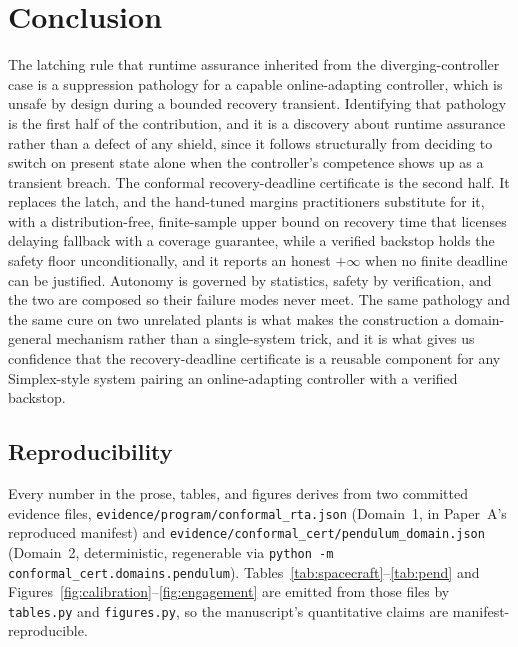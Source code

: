\documentclass[journal]{IEEEtran}
\theoremstyle{plain}
\theoremstyle{definition}
\begin{document}
\section{Conclusion}
\label{sec:conclusion}
The latching rule that runtime assurance inherited from the diverging-controller case is a
suppression pathology for a capable online-adapting controller, which is unsafe by design
during a bounded recovery transient. Identifying that pathology is the first half of the
contribution, and it is a discovery about runtime assurance rather than a defect of any
shield, since it follows structurally from deciding to switch on present state alone when the
controller's competence shows up as a transient breach. The conformal recovery-deadline
certificate is the second half. It replaces
the latch, and the hand-tuned margins practitioners substitute for it, with a
distribution-free, finite-sample upper bound on recovery time that licenses
delaying fallback with a coverage guarantee, while a verified backstop holds the safety floor
unconditionally, and it reports an honest $+\infty$ when no finite deadline can be justified.
Autonomy is governed by statistics, safety by verification, and the two are composed so their
failure modes never meet. The same
pathology and the same cure on two unrelated plants is what makes the construction a
domain-general mechanism rather than a single-system trick, and it is what gives us
confidence that the recovery-deadline certificate is a reusable component for any
Simplex-style system pairing an online-adapting controller with a verified backstop.

\subsection{Reproducibility} Every number in the prose, tables, and figures derives from two
committed evidence files, \texttt{evidence/\allowbreak{}program/\allowbreak{}conformal\_rta.json} (Domain~1, in
Paper~A's reproduced manifest) and \texttt{evidence/\allowbreak{}conformal\_cert/\allowbreak{}pendulum\_domain.json}
(Domain~2, deterministic, regenerable via \texttt{python -m conformal\_cert.domains.pendulum}).
Tables~\ref{tab:spacecraft}--\ref{tab:pend} and
Figures~\ref{fig:calibration}--\ref{fig:engagement} are emitted from those files by
\texttt{tables.py} and \texttt{figures.py}, so the manuscript's quantitative claims are
manifest-reproducible.
\end{document}
